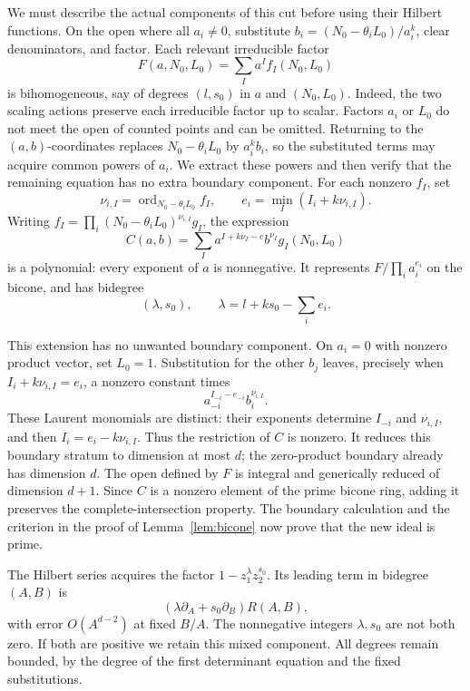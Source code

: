 We must describe the actual components of this cut before using
their Hilbert functions.  On the open where all \(a_i\ne0\),
substitute \(b_i=(N_0-\theta_iL_0)/a_i^k\), clear denominators, and
factor.  Each relevant irreducible factor
\[
 F(a,N_0,L_0)=\sum_I a^If_I(N_0,L_0)
\]
is bihomogeneous, say of degrees \((l,s_0)\) in \(a\) and
\((N_0,L_0)\).  Indeed, the two scaling actions preserve each
irreducible factor up to scalar.  Factors \(a_i\) or \(L_0\) do
not meet the open of counted points and can be omitted.
Returning to the \((a,b)\)-coordinates replaces
\(N_0-\theta_iL_0\) by \(a_i^kb_i\), so the substituted terms may
acquire common powers of \(a_i\).  We extract these powers and then
verify that the remaining equation has no extra boundary component.
For each nonzero \(f_I\), set
\[
 \nu_{i,I}=\operatorname{ord}_{N_0-\theta_iL_0}f_I,\qquad
 e_i=\min_I(I_i+k\nu_{i,I}).
\]
Writing
\(f_I=\prod_i(N_0-\theta_iL_0)^{\nu_{i,I}}g_I\), the expression
\begin{equation}
 C(a,b)=\sum_I
 a^{I+k\nu_I-e}b^{\nu_I}g_I(N_0,L_0)
 \label{eq:saturated-bihomogeneous-cut}
\end{equation}
is a polynomial: every exponent of \(a\) is nonnegative.
It represents \(F/\prod_i a_i^{e_i}\) on the bicone, and has
bidegree
\[
 (\lambda,s_0),\qquad \lambda=l+ks_0-\sum_i e_i.
\]

This extension has no unwanted boundary component.  On \(a_i=0\)
with nonzero product vector, set \(L_0=1\).  Substitution for the
other \(b_j\) leaves, precisely when \(I_i+k\nu_{i,I}=e_i\),
a nonzero constant times
\[
 a_{-i}^{I_{-i}-e_{-i}}b_i^{\nu_{i,I}}.
\]
These Laurent monomials are distinct: their exponents determine
\(I_{-i}\) and \(\nu_{i,I}\), and then
\(I_i=e_i-k\nu_{i,I}\).  Thus the restriction of \(C\) is nonzero.
It reduces this boundary stratum to dimension at most \(d\);
the zero-product boundary already has dimension \(d\).
The open defined by \(F\) is integral and generically reduced of
dimension \(d+1\).  Since \(C\) is a nonzero element of the prime
bicone ring, adding it preserves the complete-intersection property.
The boundary calculation and the criterion in the proof of
Lemma~\ref{lem:bicone} now prove that the new ideal is prime.

The Hilbert series acquires the factor
\(1-z_1^\lambda z_2^{s_0}\).  Its leading term in bidegree \((A,B)\) is
\begin{equation}
 (\lambda\partial_A+s_0\partial_B)R(A,B),
 \label{eq:cut-hilbert-leading}
\end{equation}
with error \(O(A^{d-2})\) at fixed \(B/A\).
The nonnegative integers \(\lambda,s_0\) are not both zero.
If both are positive we retain this mixed component.
All degrees remain bounded, by the degree of the first determinant
equation and the fixed substitutions.

